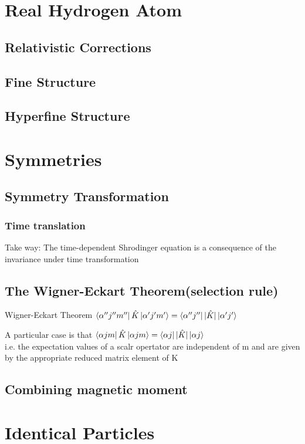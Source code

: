 \documentclass[12pt,a4paper]{article}
\begin{document}
\section{Real Hydrogen Atom}
\subsection{Relativistic Corrections}
\subsection{Fine Structure}
\subsection{Hyperfine Structure}
\section{Symmetries}

\subsection{Symmetry Transformation}
\subsubsection{Time translation}
Take way: The time-dependent Shrodinger equation is a consequence of the invariance under time transformation
\subsection{The Wigner-Eckart Theorem(selection rule)}
\begin{theorem}
    {Wigner-Eckart Theorem}
    {$ \bra {\alpha'' j''m''}\hat{K}\ket{\alpha' j'm'} = \bra{\alpha''j''}|\hat{K}|\ket{\alpha'j'}$}
\end{theorem}
A particular case is that $ \bra {\alpha jm}\hat{K}\ket{\alpha jm} = \bra{\alpha j}|\hat{K}|\ket{\alpha j}$\\
i.e. the expectation values of a scalr opertator are independent of m and are given by the appropriate reduced matrix element of K
\subsection{Combining magnetic moment}
\section{Identical Particles}
\end{document}

